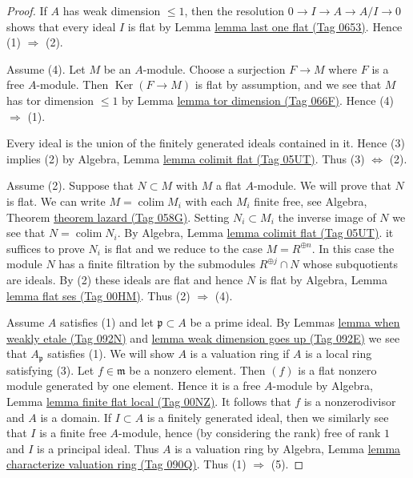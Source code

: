 \documentclass{amsart}
\theoremstyle{plain}
\theoremstyle{definition}
\theoremstyle{remark}
\numberwithin{equation}{subsection}
\def\colim{\mathop{\mathrm{colim}}\nolimits}
\def\Ker{\mathop{\mathrm{Ker}}}
\begin{document}
\begin{proof}
If $A$ has weak dimension $\leq 1$, then the resolution
$0 \to I \to A \to A/I \to 0$ shows that every ideal $I$
is flat by Lemma \href{https://stacks.math.columbia.edu/tag/0653}{lemma last one flat (Tag 0653)}.
Hence (1) $\Rightarrow$ (2).

\medskip\noindent
Assume (4). Let $M$ be an $A$-module. Choose a surjection
$F \to M$ where $F$ is a free $A$-module. Then $\Ker(F \to M)$
is flat by assumption, and we see that $M$ has tor dimension
$\leq 1$ by Lemma \href{https://stacks.math.columbia.edu/tag/066F}{lemma tor dimension (Tag 066F)}.
Hence (4) $\Rightarrow$ (1).

\medskip\noindent
Every ideal is the union of the finitely generated ideals
contained in it. Hence (3) implies (2) by
Algebra, Lemma \href{https://stacks.math.columbia.edu/tag/05UT}{lemma colimit flat (Tag 05UT)}.
Thus (3) $\Leftrightarrow$ (2).

\medskip\noindent
Assume (2). Suppose that $N \subset M$ with $M$ a flat $A$-module.
We will prove that $N$ is flat.
We can write $M = \colim M_i$ with each $M_i$ finite free, see
Algebra, Theorem \href{https://stacks.math.columbia.edu/tag/058G}{theorem lazard (Tag 058G)}.
Setting $N_i \subset M_i$ the inverse image of $N$ we see that
$N = \colim N_i$. By
Algebra, Lemma \href{https://stacks.math.columbia.edu/tag/05UT}{lemma colimit flat (Tag 05UT)}.
it suffices to prove $N_i$ is flat and we reduce
to the case $M = R^{\oplus n}$. In this case
the module $N$ has a finite filtration by the submodules
$R^{\oplus j} \cap N$ whose subquotients are ideals.
By (2) these ideals are flat and hence $N$ is flat by
Algebra, Lemma \href{https://stacks.math.columbia.edu/tag/00HM}{lemma flat ses (Tag 00HM)}. Thus (2) $\Rightarrow$ (4).

\medskip\noindent
Assume $A$ satisfies (1) and let $\mathfrak p \subset A$ be a
prime ideal. By
Lemmas \href{https://stacks.math.columbia.edu/tag/092N}{lemma when weakly etale (Tag 092N)} and \href{https://stacks.math.columbia.edu/tag/092E}{lemma weak dimension goes up (Tag 092E)}
we see that $A_\mathfrak p$ satisfies (1). We will show $A$ is a valuation ring
if $A$ is a local ring satisfying (3). Let $f \in \mathfrak m$
be a nonzero element. Then $(f)$ is a flat nonzero module generated by
one element. Hence it is a free $A$-module by
Algebra, Lemma \href{https://stacks.math.columbia.edu/tag/00NZ}{lemma finite flat local (Tag 00NZ)}.
It follows that $f$ is a nonzerodivisor and $A$ is a domain.
If $I \subset A$ is a finitely generated ideal, then we similarly
see that $I$ is a finite free $A$-module, hence (by considering the
rank) free of rank $1$ and $I$ is a principal ideal. Thus $A$ is a
valuation ring by
Algebra, Lemma \href{https://stacks.math.columbia.edu/tag/090Q}{lemma characterize valuation ring (Tag 090Q)}.
Thus (1) $\Rightarrow$ (5).


\end{proof}
\end{document}
